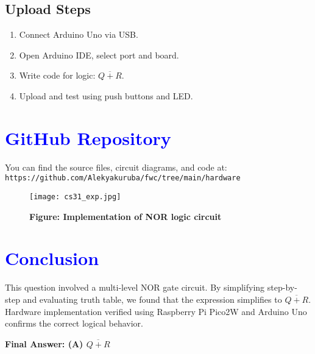 \documentclass[twocolumn]{article}
\begin{document}
\subsection*{Upload Steps}
\begin{enumerate}
    \item Connect Arduino Uno via USB.
    \item Open Arduino IDE, select port and board.
    \item Write code for logic: $\overline{Q + R}$.
    \item Upload and test using push buttons and LED.
\end{enumerate}

\section*{\textcolor{blue}{GitHub Repository}}
You can find the source files, circuit diagrams, and code at: \\
\texttt{https://github.com/Alekyakuruba/fwc/tree/main/hardware}
\begin{figure}[h]
    \centering
    \texttt{[image: cs31\_exp.jpg]}
    \caption*{\textbf{Figure: Implementation of NOR logic circuit}}
\end{figure}
\section*{\textcolor{blue}{Conclusion}}

This question involved a multi-level NOR gate circuit. By simplifying step-by-step and evaluating truth table, we found that the expression simplifies to $\overline{Q + R}$. Hardware implementation verified using Raspberry Pi Pico2W and Arduino Uno confirms the correct logical behavior.

\textbf{Final Answer: (A) $\overline{Q + R}$}
\end{document}
